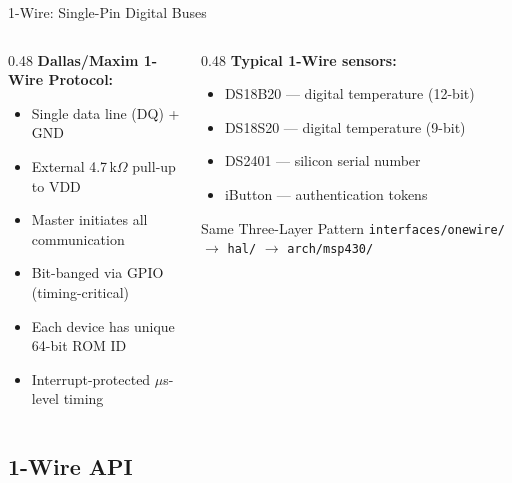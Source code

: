\documentclass[aspectratio=169, 10pt]{beamer}
\begin{document}
\begin{frame}[fragile]{1-Wire: Single-Pin Digital Buses}
\begin{columns}[T]
\begin{column}{0.48\textwidth}
\textbf{Dallas/Maxim 1-Wire Protocol:}
\begin{itemize}
  \item Single data line (DQ) + GND
  \item External 4.7\,k$\Omega$ pull-up to VDD
  \item Master initiates all communication
  \item Bit-banged via GPIO (timing-critical)
  \item Each device has unique 64-bit ROM ID
  \item Interrupt-protected $\mu$s-level timing
\end{itemize}
\end{column}

\begin{column}{0.48\textwidth}
\textbf{Typical 1-Wire sensors:}
\begin{itemize}
  \item DS18B20 --- digital temperature (12-bit)
  \item DS18S20 --- digital temperature (9-bit)
  \item DS2401 --- silicon serial number
  \item iButton --- authentication tokens
\end{itemize}

\vspace{0.3em}
\begin{alertblock}{Same Three-Layer Pattern}
\texttt{interfaces/onewire/} $\rightarrow$
\texttt{hal/} $\rightarrow$
\texttt{arch/msp430/}
\end{alertblock}
\end{column}
\end{columns}
\end{frame}

\subsection{1-Wire API}
\end{document}
